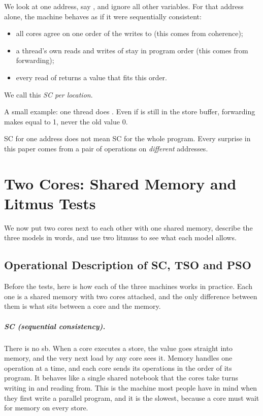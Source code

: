 We look at one address, say , and ignore all other variables. For that address alone, the machine behaves as if it were sequentially consistent:
\begin{itemize}
  \item all cores agree on one order of the writes to  (this comes from coherence);
  \item a thread's own reads and writes of  stay in program order (this comes from forwarding);
  \item every read of  returns a value that fits this order.
\end{itemize}
We call this \emph{SC per location}\cite{alglave2014herding}.

A small example: one thread does . Even if  is still in the store buffer, forwarding makes  equal to 1, never the old value 0.

\begin{notebox}
SC for one address does not mean SC for the whole program. Every surprise in this paper comes from a pair of operations on \emph{different} addresses.
\end{notebox}

\chapter{Two Cores: Shared Memory and Litmus Tests}
\label{ch:litmus}

We now put two cores next to each other with one shared memory, describe the three models in words, and use two \gls{litmus}s to see what each model allows.

\section{Operational Description of SC, TSO and PSO}
\label{sec:models-words}

Before the tests, here is how each of the three machines works in practice. Each one is a shared memory with two cores attached, and the only difference between them is what sits between a core and the memory.

\paragraph{SC (sequential consistency).} There is no \gls{sb}. When a core executes a store, the value goes straight into memory, and the very next load by any core sees it. Memory handles one operation at a time, and each core sends its operations in the order of its program. It behaves like a single shared notebook that the cores take turns writing in and reading from. This is the machine most people have in mind when they first write a parallel program, and it is the slowest, because a core must wait for memory on every store.

